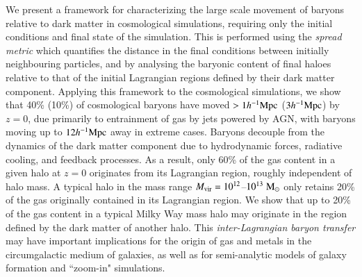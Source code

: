 We present a framework for characterizing the large scale movement of baryons
relative to dark matter in cosmological simulations, requiring only the
initial conditions and final state of the simulation. This is performed using
the {\it spread metric} which quantifies the distance in the final conditions
between initially neighbouring particles, and by analysing the baryonic
content of final haloes relative to that of the initial Lagrangian regions
defined by their dark matter component. Applying this framework to the
\simba{} cosmological simulations, we show that 40\% (10\%) of cosmological
baryons have moved $> 1h^{-1}{\rm Mpc}{}$ ($3h^{-1}{\rm Mpc}{}$) by $z=0$, due primarily to
entrainment of gas by jets powered by AGN, with baryons moving up to
$12h^{-1}{\rm Mpc}{}$ away in extreme cases. Baryons
decouple from the dynamics of the dark matter component due to hydrodynamic
forces, radiative cooling, and feedback processes. As a result, only 60\% of
the gas content in a given halo at $z=0$ originates from its Lagrangian
region, roughly independent of halo mass. A typical halo in the mass range
$M_{\rm vir} = 10^{12}$--$10^{13}\;{\rm M}_{\odot}$ only retains 20\% of the gas
originally contained in its Lagrangian region. We show that up to 20\% of the
gas content in a typical Milky Way mass halo may originate in the region
defined by the dark matter of another halo. This {\it inter-Lagrangian baryon
transfer} may have important implications for the origin of gas and metals in
the circumgalactic medium of galaxies, as well as for semi-analytic models of
galaxy formation and “zoom-in" simulations.